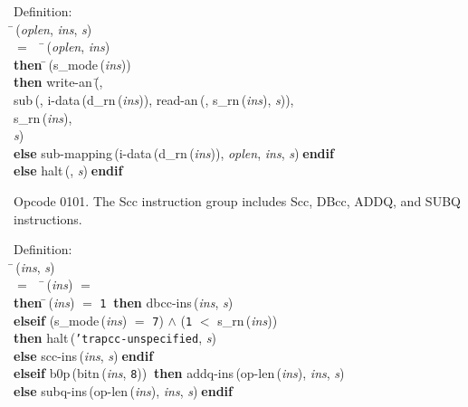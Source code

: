 \begin{tabbing}{\sc Definition}: \\  
\=\,({\it{oplen\/}}, {\it{ins\/}}, {\it{s\/}}) \\ 
$=$$\;\;\;\;$\=\,({\it{oplen\/}}, {\it{ins\/}}) \\ 
{\bf then }\=\,({\rm{s\_mode}}\,({\it{ins\/}})) \\ 
{\bf then }{\rm{write-an}}\,(\=, \\ 
{\rm{sub}}\,({}, {\rm{i-data}}\,({\rm{d\_rn}}\,({\it{ins\/}})), {\rm{read-an}}\,({}, {\rm{s\_rn}}\,({\it{ins\/}}), {\it{s\/}})), \\ 
{\rm{s\_rn}}\,({\it{ins\/}}), \\ 
{\it{s\/}})\- \\ 
{\bf else }{\rm{sub-mapping}}\,({\rm{i-data}}\,({\rm{d\_rn}}\,({\it{ins\/}})), {\it{oplen\/}}, {\it{ins\/}}, {\it{s\/}})$\;${\bf  endif}\- \\ 
{\bf else }{\rm{halt}}\,({}, {\it{s\/}})$\;${\bf  endif}\-\-
\end{tabbing}

 Opcode 0101.
 The Scc instruction group includes Scc, DBcc, ADDQ, and SUBQ instructions.
\begin{tabbing}{\sc Definition}: \\  
\=\,({\it{ins\/}}, {\it{s\/}}) \\ 
$=$$\;\;\;\;$\=\,({\it{ins\/}}) $=$ {} \\ 
{\bf then }\=\,({\it{ins\/}}) $=$ {\tt{1}}$\;\;${\bf then }{\rm{dbcc-ins}}\,({\it{ins\/}}, {\it{s\/}}) \\ 
{\bf elseif }({\rm{s\_mode}}\,({\it{ins\/}}) $=$ {\tt{7}}) $\wedge$ ({\tt{1}} $<$ {\rm{s\_rn}}\,({\it{ins\/}})) \\ 
{\bf then }{\rm{halt}}\,({\tt{'}}{\tt{trapcc-unspecified}}, {\it{s\/}}) \\ 
{\bf else }{\rm{scc-ins}}\,({\it{ins\/}}, {\it{s\/}})$\;${\bf  endif}\- \\ 
{\bf elseif }{\rm{b0p}}\,({\rm{bitn}}\,({\it{ins\/}}, {\tt{8}}))$\;\;${\bf then }{\rm{addq-ins}}\,({\rm{op-len}}\,({\it{ins\/}}), {\it{ins\/}}, {\it{s\/}}) \\ 
{\bf else }{\rm{subq-ins}}\,({\rm{op-len}}\,({\it{ins\/}}), {\it{ins\/}}, {\it{s\/}})$\;${\bf  endif}\-\-
\end{tabbing}


